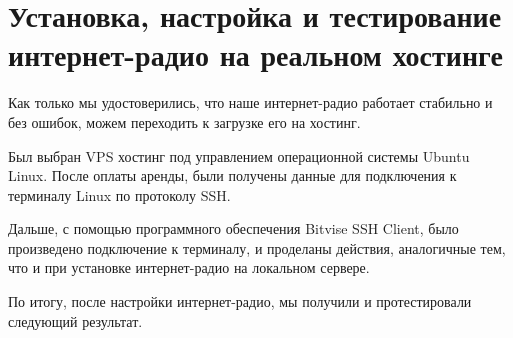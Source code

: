 \section{Установка, настройка и тестирование интернет-радио на реальном хостинге}

Как только мы удостоверились, что наше интернет-радио работает стабильно и без ошибок, можем переходить к загрузке его на хостинг.

Был выбран VPS хостинг под управлением операционной системы Ubuntu Linux. После оплаты аренды, были получены данные для подключения к терминалу Linux по протоколу SSH.

Дальше, с помощью программного обеспечения Bitvise SSH Client, было произведено подключение к терминалу, и проделаны действия, аналогичные тем, что и при установке интернет-радио на локальном сервере.

По итогу, после настройки интернет-радио, мы получили и протестировали следующий результат.
